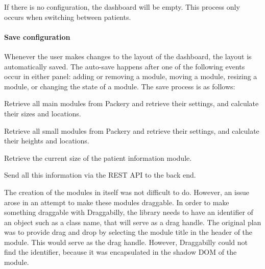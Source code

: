             \noindent If there is no configuration, the dashboard will be empty. This process only occurs when switching between patients.

            \paragraph{Save configuration} Whenever the user makes changes to the layout of the dashboard, the layout is automatically saved. The auto-save happens after one of the following events occur in either panel: adding or removing a module, moving a module, resizing a module, or changing the state of a module. The save process is as follows:
            \vspace{-6pt}
            \begin{myenumerate}
                \item Retrieve all main modules from Packery and retrieve their settings, and calculate their sizes and locations.
                \item Retrieve all small modules from Packery and retrieve their settings, and calculate their heights and locations.
                \item Retrieve the current size of the patient information module.
                \item Send all this information via the REST API to the back end.
            \end{myenumerate}


            The creation of the modules in itself was not difficult to do. However, an issue arose in an attempt to make these modules draggable. In order to make something draggable with Draggabilly, the library needs to have an identifier of an object such as a class name, that will serve as a drag handle. The original plan was to provide drag and drop by selecting the module title in the header of the module. This would serve as the drag handle. However, Draggabilly could not find the identifier, because it was encapsulated in the shadow DOM of the module.

